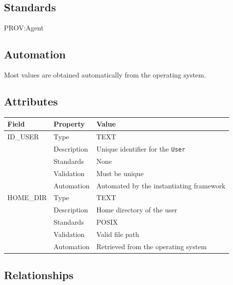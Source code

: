 \documentclass[
]{article}
\newcounter{none}
\begin{document}
\subsection{Standards}\label{standards-37}

PROV:Agent

\subsection{Automation}\label{automation-37}

Most values are obtained automatically from the operating system.

\subsection{Attributes}\label{attributes-31}

{\def\LTcaptype{none} 
\begin{longtable}[]{@{}lll@{}}
\toprule\noalign{}
Field & Property & Value \\
\midrule\noalign{}
\endhead
\bottomrule\noalign{}
\endlastfoot
ID\_USER & Type & TEXT \\
& Description & Unique identifier for the \texttt{User} \\
& Standards & None \\
& Validation & Must be unique \\
& Automation & Automated by the instantiating framework \\
HOME\_DIR & Type & TEXT \\
& Description & Home directory of the user \\
& Standards & POSIX \\
& Validation & Valid file path \\
& Automation & Retrieved from the operating system \\
\end{longtable}
}

\subsection{Relationships}\label{relationships-30}
\end{document}

